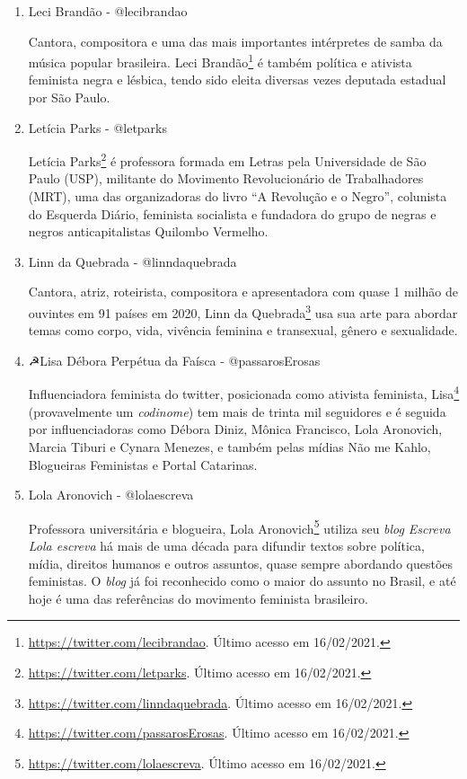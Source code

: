 \documentclass[
	12pt,				%
	openright,			%
	twoside,			%
	a4paper,			%
	english,			%
	brazil				%
	]{abntex2}
\begin{document}
\begin{anexosenv}
\begin{enumerate}
 \item Leci Brandão - @lecibrandao
 
 Cantora, compositora e uma das mais importantes intérpretes de samba da música popular brasileira. Leci Brandão\footnote{\url{https://twitter.com/lecibrandao}. Último acesso em 16/02/2021.} é também política e ativista feminista negra e lésbica, tendo sido eleita diversas vezes deputada estadual por São Paulo.

 \item Letícia Parks - @letparks
 
 Letícia Parks\footnote{\url{https://twitter.com/letparks}. Último acesso em 16/02/2021.} é professora formada em Letras pela Universidade de São Paulo (USP), militante do Movimento Revolucionário de Trabalhadores (MRT), uma das organizadoras do livro ``A Revolução e o Negro'', colunista do Esquerda Diário, feminista socialista e fundadora do grupo de negras e negros anticapitalistas Quilombo Vermelho.

 \item Linn da Quebrada - @linndaquebrada
 
 Cantora, atriz, roteirista, compositora e apresentadora com quase 1 milhão de ouvintes em 91 países em 2020, Linn da Quebrada\footnote{\url{https://twitter.com/linndaquebrada}. Último acesso em 16/02/2021.} usa sua arte para abordar temas como corpo, vida, vivência feminina e transexual, gênero e sexualidade.

 \item $☭$Lisa Débora Perpétua da Faísca - @passarosErosas
 
 Influenciadora feminista do twitter, posicionada como ativista feminista, Lisa\footnote{\url{https://twitter.com/passarosErosas}. Último acesso em 16/02/2021.} (provavelmente um \textit{codinome}) tem mais de trinta mil seguidores e é seguida por influenciadoras como Débora Diniz, Mônica Francisco, Lola Aronovich, Marcia Tiburi e Cynara Menezes, e também pelas mídias Não me Kahlo, Blogueiras Feministas e Portal Catarinas.

 \item Lola Aronovich - @lolaescreva
 
 Professora universitária e blogueira, Lola Aronovich\footnote{\url{https://twitter.com/lolaescreva}. Último acesso em 16/02/2021.} utiliza seu \textit{blog} \textit{Escreva Lola escreva} há mais de uma década para difundir textos sobre política, mídia, direitos humanos e outros assuntos, quase sempre abordando questões feministas. O \textit{blog} já foi reconhecido como o maior do assunto no Brasil, e até hoje é uma das referências do movimento feminista brasileiro.


\end{enumerate}
\end{anexosenv}
\end{document}
